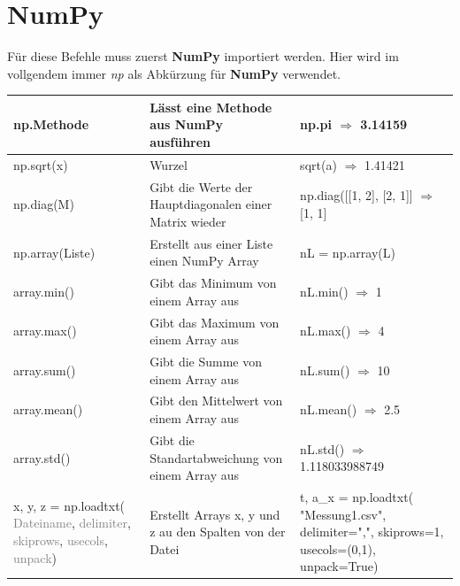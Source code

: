 \documentclass[a4paper,12pt]{article}
\begin{document}

\newpage
\section*{NumPy}
 

Für diese Befehle muss zuerst \textbf{NumPy} importiert werden. Hier wird im vollgendem immer \textit{np} als Abkürzung für \textbf{NumPy} verwendet.

\begin{center}
\begin{tabular}{|p{3cm}|p{8cm}|p{3cm}|}
\hline
np.Methode & Lässt eine Methode aus NumPy ausführen & np.pi \newline{} $\Rightarrow$ 3.14159 \\
\hline
np.sqrt(x) & Wurzel & sqrt(a) \newline{} $\Rightarrow$ 1.41421 \\
\hline
np.diag(M) & Gibt die Werte der Hauptdiagonalen einer Matrix wieder & np.diag([[1, 2], [2, 1]] \newline{} $\Rightarrow$ [1, 1] \\
\hline
np.array(Liste) & Erstellt aus einer Liste einen NumPy Array & nL = np.array(L) \\
\hline
array.min() & Gibt das Minimum von einem Array aus & nL.min() \newline{} $\Rightarrow$ 1 \\
\hline
array.max() & Gibt das Maximum von einem Array aus & nL.max() \newline{} $\Rightarrow$ 4 \\
\hline
array.sum() & Gibt die Summe von einem Array aus & nL.sum() \newline{} $\Rightarrow$ 10 \\
\hline
array.mean() & Gibt den Mittelwert von einem Array aus & nL.mean() \newline{} $\Rightarrow$ 2.5 \\
\hline
array.std() & Gibt die Standartabweichung von einem Array aus & nL.std() \newline{} $\Rightarrow$ 1.118033988749 \\
\hline
x, y, z = np.loadtxt( \textcolor{gray}{Dateiname}, \textcolor{gray}{delimiter}, \textcolor{gray}{skiprows}, \textcolor{gray}{usecols}, \textcolor{gray}{unpack}) & Erstellt Arrays x, y und z au den Spalten von der Datei & t, a\_x = np.loadtxt( "Messung1.csv", delimiter=",", skiprows=1, usecols=(0,1), unpack=True) \\ 

\end{tabular}
\end{center}
\end{document}
